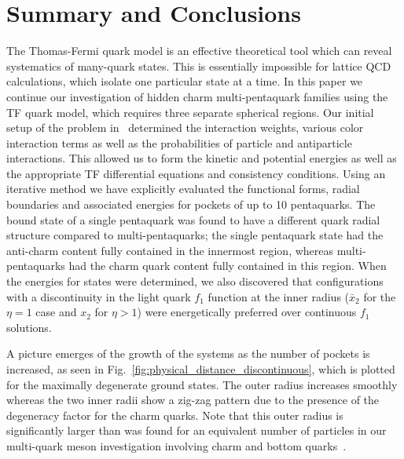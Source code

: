 \documentclass[preprint,12pt]{elsarticle}
\begin{document}

\section{Summary and Conclusions}

The Thomas-Fermi quark model is an effective theoretical tool which can reveal systematics of many-quark states. This is essentially impossible for lattice QCD calculations, which isolate one particular state at a time. In this paper we continue our investigation of hidden charm multi-pentaquark families using the TF quark model, which requires three separate spherical regions. Our initial setup of the problem in~\cite{giri2021investigation} determined the interaction weights, various color interaction terms as well as the probabilities of particle and antiparticle interactions. This allowed us to form the kinetic and potential energies as well as the appropriate TF differential equations and consistency conditions. Using an iterative method we have explicitly evaluated the functional forms, radial boundaries and associated energies for pockets of up to 10 pentaquarks. The bound state of a single pentaquark was found to have a different quark radial structure compared to multi-pentaquarks; the single pentaquark state had the anti-charm content fully contained in the innermost region, whereas multi-pentaquarks had the charm quark content fully contained in this region. When the energies for states were determined, we also discovered that configurations with a discontinuity in the light quark $f_1$ function at the inner radius ($\bar{x}_2$ for the $\eta = 1$ case and $x_2$ for $\eta> 1$) were energetically preferred over continuous $f_1$ solutions.

A picture emerges of the growth of the systems as the number of pockets is increased, as seen in Fig.~\ref{fig:physical_distance_discontinuous}, which is plotted for the maximally degenerate ground states. The outer radius increases smoothly whereas the two inner radii show a zig-zag pattern due to the presence of the degeneracy factor for the charm quarks. Note that this outer radius is significantly larger than was found for an equivalent number of particles in our multi-quark meson investigation involving charm and bottom quarks~\cite{Baral:2019qpl}. 
\end{document}
